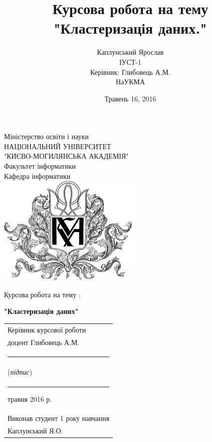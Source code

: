 \documentclass[a4paper,14pt,russian]{extreport}
\begin{document}
 

\title{Курсова робота на тему\\ "Кластеризація даних."\\ \textit{} }
\date{Травень 16, 2016}
\author{Каплунський  Ярослав\\ ІУСТ-1 \\Керівник: Глибовець А.М. \\
        НаУКМА}




\thispagestyle{empty}
\begin{center}
Міністерство освіти і науки\\ НАЦІОНАЛЬНИЙ УНІВЕРСИТЕТ \\ "КИЄВО-МОГИЛЯНСЬКА АКАДЕМІЯ"\\ Факультет інформатики\\
Кафедра інформатики\\
\vspace{5mm}
\includegraphics[scale=0.8]{emblem}
\end{center}
 


\begin{center}
Курсова робота на тему :
\end{center}
 
 \begin{center}
\begin{Large}
\textbf{
   "Кластеризація даних"
 }
\end{Large}
\end{center}

 
\vspace{20mm}
 
 
	\begin{flushright}
		\begin{tabular}{@{}l@{}}
			Керівник курсової роботи \\
			доцент Глибовець А.М.\\
			 
			\noindent\rule{4cm}{0.4pt}\\
			(\textit{підпис})\\
			\noindent\rule{1cm}{0.4pt} травня 2016 р.\\
			Виконав студент 1 року навчання \\
			Каплунський  Я.О.\\
		\end{tabular}
	\end{flushright}
		 
\end{document}
